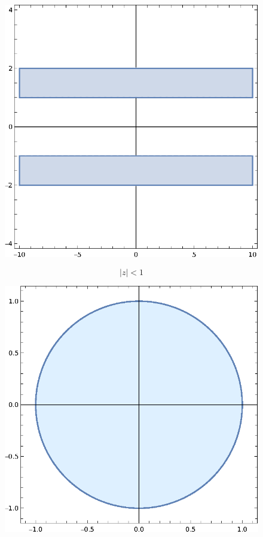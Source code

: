 \documentclass[11pt]{article}
\begin{document}
\begin{enumerate}
    \begin{figure}[H]
    \centering
    \includegraphics[scale=0.8]{Graphics/P3-1.eps}
    \end{figure}

    \[|z| < 1\]

    \begin{figure}[H]
    \centering
    \includegraphics[scale=0.8]{Graphics/P3-2.eps}
    \end{figure}


\end{enumerate}
\end{document}
